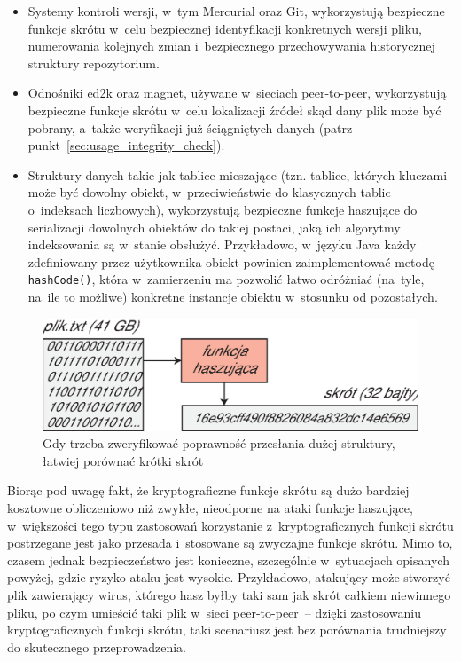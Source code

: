 \begin{itemize}

    \item Systemy kontroli wersji, w~tym Mercurial oraz Git, wykorzystują
    bezpieczne funkcje skrótu w~celu bezpiecznej identyfikacji konkretnych
    wersji pliku, numerowania kolejnych zmian i~bezpiecznego przechowywania
    historycznej struktury repozytorium.

    \item Odnośniki ed2k oraz magnet, używane w~sieciach peer-to-peer, wykorzystują
    bezpieczne funkcje skrótu w~celu lokalizacji źródeł skąd dany plik może być
    pobrany, a~także weryfikacji już ściągniętych danych (patrz
    punkt~\ref{sec:usage_integrity_check}).

    \item Struktury danych takie jak tablice mieszające (tzn. tablice, których
    kluczami może być dowolny obiekt, w~przeciwieństwie do klasycznych tablic
    o~indeksach liczbowych), wykorzystują bezpieczne funkcje haszujące do
    serializacji dowolnych obiektów do takiej postaci, jaką ich algorytmy
    indeksowania są w~stanie obsłużyć. Przykładowo, w~języku Java każdy
    zdefiniowany przez użytkownika obiekt powinien zaimplementować metodę
    \texttt{hashCode()}, która w~zamierzeniu ma pozwolić łatwo odróżniać
    (na~tyle, na~ile to możliwe) konkretne instancje obiektu w~stosunku od
    pozostałych.

\end{itemize}

\begin{figure}[bht]
    \includegraphics[width=12cm]{img/usage3.eps}
    \caption{Gdy trzeba zweryfikować poprawność przesłania dużej struktury,
    łatwiej porównać krótki skrót}
\end{figure}

Biorąc pod uwagę fakt, że kryptograficzne funkcje skrótu są dużo bardziej
kosztowne obliczeniowo niż zwykłe, nieodporne na ataki funkcje haszujące,
w~większości tego typu zastosowań korzystanie z~kryptograficznych funkcji
skrótu postrzegane jest jako przesada i~stosowane są zwyczajne funkcje skrótu.
Mimo to, czasem jednak bezpieczeństwo jest konieczne, szczególnie w~sytuacjach
opisanych powyżej, gdzie ryzyko ataku jest wysokie. Przykładowo, atakujący może
stworzyć plik zawierający wirus, którego hasz byłby taki sam jak skrót całkiem
niewinnego pliku, po czym umieścić taki plik w~sieci peer-to-peer~-- dzięki
zastosowaniu kryptograficznych funkcji skrótu, taki scenariusz jest bez
porównania trudniejszy do skutecznego przeprowadzenia.



